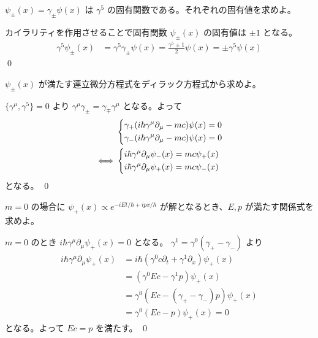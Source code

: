 \documentclass[uplatex,dvipdfmx,a4paper,11pt]{jlreq}
\makeatletter
\numberwithin{equation}{section}
\theoremstyle{definition}
\renewenvironment{proof}[1][\proofname]{\par
  \normalfont
  \topsep6\p@\@plus6\p@ \trivlist
  \item[\hskip\labelsep{\bfseries #1}\@addpunct{\bfseries}]\ignorespaces\quad\par
}{%
  \qed\endtrivlist\@endpefalse
}
\renewcommand\proofname{証明}
\makeatother
\begin{document}
\begin{problem}
$\psi_{\pm}(x) = \gamma_{\pm}\psi(x)$ は $\gamma^5$ の固有関数である。それぞれの固有値を求めよ。
\end{problem}
\begin{proof}
  カイラリティを作用させることで固有関数 $\psi_\pm(x)$ の固有値は $\pm 1$ となる。
  \begin{align}
    \gamma^5\psi_\pm(x) & = \gamma^5\gamma_\pm\psi(x) = \frac{\gamma^5 \pm 1}{2}\psi(x) = \pm\gamma^5\psi(x)
  \end{align}
\end{proof}

\begin{problem}
$\psi_\pm(x)$ が満たす連立微分方程式をディラック方程式から求めよ。
\end{problem}
\begin{proof}
  $\lbrace\gamma^\mu, \gamma^5\rbrace = 0$ より $\gamma^\mu\gamma_\pm = \gamma_\mp\gamma^\mu$ となる。よって
  \begin{align}
         & \begin{dcases}
             \gamma_+(i\hbar\gamma^\mu\partial_\mu - mc)\psi(x) = 0 \\
             \gamma_-(i\hbar\gamma^\mu\partial_\mu - mc)\psi(x) = 0 \\
           \end{dcases} \\
    \iff & \begin{dcases}
             i\hbar\gamma^\mu\partial_\mu\psi_-(x) = mc\psi_+(x) \\
             i\hbar\gamma^\mu\partial_\mu\psi_+(x) = mc\psi_-(x) \\
           \end{dcases}
  \end{align}
  となる。
\end{proof}

\begin{problem}
$m = 0$ の場合に $\psi_+(x) \propto e^{-iEt/\hbar+ipx/\hbar}$ が解となるとき、$E, p$ が満たす関係式を求めよ。
\end{problem}
\begin{proof}
  $m = 0$ のとき $i\hbar\gamma^\mu\partial_\mu\psi_+(x) = 0$ となる。 $\gamma^1 = \gamma^0(\gamma_+ - \gamma_-)$ より
  \begin{align}
    i\hbar\gamma^\mu\partial_\mu\psi_+(x) & = i\hbar(\gamma^0c\partial_t + \gamma^1\partial_x)\psi_+(x) \\
                                          & = (\gamma^0Ec - \gamma^1p)\psi_+(x)                         \\
                                          & = \gamma^0(Ec - (\gamma_+ - \gamma_-)p)\psi_+(x)            \\
                                          & = \gamma^0(Ec - p)\psi_+(x) = 0
  \end{align}
  となる。よって $Ec = p$ を満たす。
\end{proof}
\end{document}
